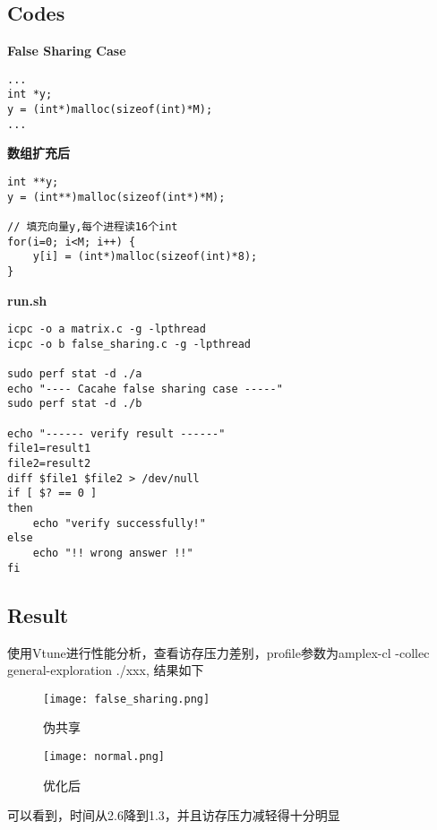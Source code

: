 \documentclass{article}
\begin{document}
\subsection{Codes}
\textbf{False Sharing Case}
\begin{lstlisting}
...
int *y;
y = (int*)malloc(sizeof(int)*M);
...
\end{lstlisting}

\textbf{数组扩充后}
\begin{lstlisting}
int **y;
y = (int**)malloc(sizeof(int*)*M);

// 填充向量y,每个进程读16个int
for(i=0; i<M; i++) {
    y[i] = (int*)malloc(sizeof(int)*8);
}
\end{lstlisting}

\textbf{run.sh}
\begin{lstlisting}
icpc -o a matrix.c -g -lpthread
icpc -o b false_sharing.c -g -lpthread

sudo perf stat -d ./a
echo "---- Cacahe false sharing case -----"
sudo perf stat -d ./b

echo "------ verify result ------"
file1=result1
file2=result2
diff $file1 $file2 > /dev/null
if [ $? == 0 ]
then
    echo "verify successfully!"
else
    echo "!! wrong answer !!"
fi
\end{lstlisting}


\subsection{Result}
使用Vtune进行性能分析，查看访存压力差别，profile参数为amplex-cl 
-collec general-exploration ./xxx,
结果如下

\begin{figure}[htpb]
    \centering
    \texttt{[image: false\_sharing.png]}
    \caption{伪共享}
\end{figure}

\begin{figure}[htpb]
    \centering
    \texttt{[image: normal.png]}
    \caption{优化后}
\end{figure}
可以看到，时间从2.6降到1.3，并且访存压力减轻得十分明显
\end{document}
